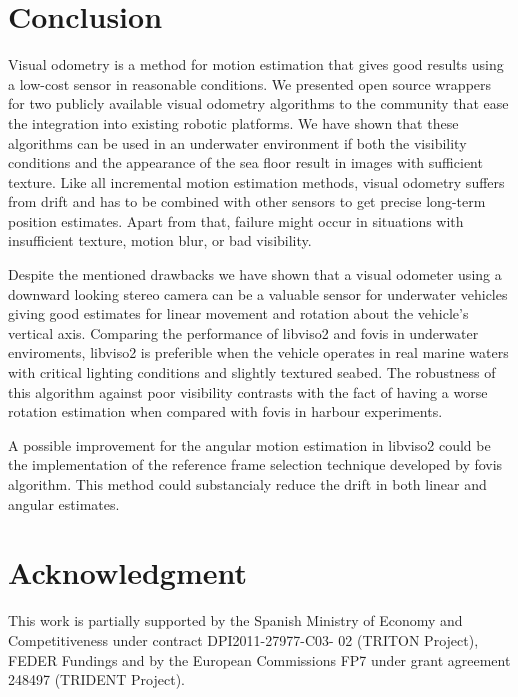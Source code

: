 \documentclass[conference]{IEEEtran}
\begin{document}
\section{Conclusion
  \label{conclusion}
}

Visual odometry is a method for motion estimation that gives good results using a low-cost sensor in reasonable conditions. We presented open source wrappers for two publicly available visual odometry algorithms to the community that ease the integration into existing robotic platforms.
We have shown that these algorithms can be used in an underwater environment if both the visibility conditions and the appearance of the sea floor result in images with sufficient texture. Like all incremental motion estimation methods, visual odometry suffers from drift and has to be combined with other sensors to get precise long-term position estimates. Apart from that, failure might occur in situations with insufficient texture, motion blur, or bad visibility.

Despite the mentioned drawbacks we have shown that a visual odometer using a downward looking stereo camera can be a valuable sensor for underwater vehicles giving good estimates for linear movement and rotation about the vehicle's vertical axis. Comparing the performance of libviso2 and fovis in underwater enviroments, libviso2 is preferible when the vehicle operates in real marine waters with critical lighting conditions and slightly textured seabed. The robustness of this algorithm against poor visibility contrasts with the fact of having a worse rotation estimation when compared with fovis in harbour experiments.

A possible improvement for the angular motion estimation in libviso2 could be the implementation of the reference frame selection technique developed by fovis algorithm. This method could substancialy reduce the drift in both linear and angular estimates.

\section{Acknowledgment
  \label{acknowledgment}
}

This work is partially supported by the Spanish Ministry of Economy and Competitiveness under contract DPI2011-27977-C03- 02 (TRITON Project), FEDER Fundings and by the European Commissions FP7 under grant agreement 248497 (TRIDENT Project).




\end{document}

